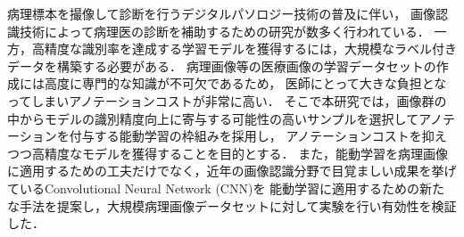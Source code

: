 病理標本を撮像して診断を行うデジタルパソロジー技術の普及に伴い，
画像認識技術によって病理医の診断を補助するための研究が数多く行われている．
一方，高精度な識別率を達成する学習モデルを獲得するには，大規模なラベル付きデータを構築する必要がある．
病理画像等の医療画像の学習データセットの作成には高度に専門的な知識が不可欠であるため，
医師にとって大きな負担となってしまいアノテーションコストが非常に高い．
そこで本研究では，画像群の中からモデルの識別精度向上に寄与する可能性の高いサンプルを選択してアノテーションを付与する能動学習の枠組みを採用し，
アノテーションコストを抑えつつ高精度なモデルを獲得することを目的とする．
また，能動学習を病理画像に適用するための工夫だけでなく，近年の画像認識分野で目覚ましい成果を挙げているConvolutional Neural Network (CNN)を
能動学習に適用するための新たな手法を提案し，大規模病理画像データセットに対して実験を行い有効性を検証した．
